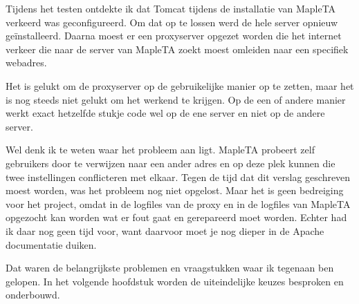 \label{sec:proxy} 

Tijdens het testen ontdekte ik dat Tomcat tijdens de installatie van
MapleTA verkeerd was geconfigureerd. Om dat op te lossen werd de hele
server opnieuw geïnstalleerd. Daarna moest er een proxyserver
opgezet worden die het internet verkeer die naar de server van MapleTA
zoekt moest omleiden naar een specifiek webadres.

Het is gelukt om de proxyserver op de gebruikelijke manier op te
zetten, maar het is nog steeds niet gelukt om het werkend te
krijgen. Op de een of andere manier werkt exact hetzelfde stukje code
wel op de ene server en niet op de andere server.

Wel denk ik te weten waar het probleem aan ligt. MapleTA probeert zelf
gebruikers door te verwijzen naar een ander adres en op deze plek
kunnen die twee instellingen conflicteren met elkaar. Tegen de tijd
dat dit verslag geschreven moest worden, was het probleem nog niet
opgelost. Maar het is geen bedreiging voor het project, omdat in de
logfiles van de proxy en in de logfiles van MapleTA opgezocht kan
worden wat er fout gaat en gerepareerd moet worden. Echter had ik daar
nog geen tijd voor, want daarvoor moet je nog dieper in de Apache
documentatie \cite{apache2} duiken.

Dat waren de belangrijkste problemen en vraagstukken waar ik tegenaan
ben gelopen. In het volgende hoofdstuk worden de uiteindelijke keuzes
besproken en onderbouwd.
